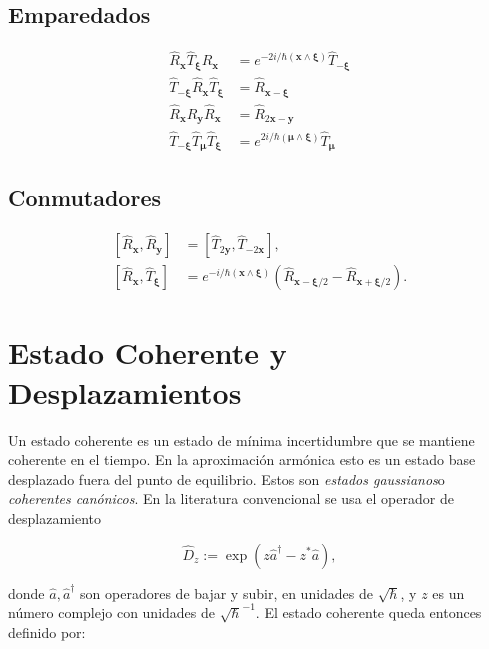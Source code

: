 \documentclass[a4paper,10pt]{article}
\newcommand{\xfase}{\mathbf{x}}
\newcommand{\yfase}{\mathbf{y}}
\newcommand{\xifase}{ {\boldsymbol{\xi}} }
\newcommand{\mufase}{ {\boldsymbol{\mu}} }
\begin{document}
\subsection{Emparedados}

\begin{equation}
\begin{split}
\hat{R}_\xfase \hat{T}_\xifase \hat{R}_\xfase 
&=e^{-2i/\hbar(\xfase\wedge\xifase)} \hat{T}_{-\xifase}\\
\hat{T}_{-\xifase}\hat{R}_\xfase \hat{T}_\xifase &=
\hat{R}_{\xfase-\xifase}\\
 \hat{R}_{\xfase}\hat{R}_\yfase \hat{R}_\xfase &=
\hat{R}_{2\xfase-\yfase}\\
 \hat{T}_{-\xifase}\hat{T}_\mufase \hat{T}_\xifase &=
e^{2i/\hbar (\mufase\wedge\xifase)}\hat{T}_{\mufase}
\end{split}
\end{equation}

\subsection{Conmutadores}


\begin{equation}
\begin{split}
[\hat{R}_\xfase ,\hat{R}_\yfase ]&=
[\hat{T}_{2\yfase} ,\hat{T}_{-2\xfase} ],\\
[\hat{R}_\xfase ,\hat{T}_\xifase ]&=
e^{-i/\hbar(\xfase\wedge\xifase)}
(\hat{R}_{\xfase-\xifase/2}-\hat{R}_{\xfase+\xifase/2}).
\end{split}
\end{equation}


\section{Estado Coherente y Desplazamientos}

Un estado coherente es un estado de mínima incertidumbre 
que se mantiene coherente en el tiempo. En la aproximación
armónica esto es un estado base desplazado fuera del punto de
equilibrio. Estos son \emph{estados gaussianos}o 
\emph{ coherentes canónicos}. En la literatura convencional
se usa el operador de desplazamiento

\begin{equation}
\hat{D}_z:= \exp(z\hat{a}^\dagger-z^*\hat{a}),
\end{equation}

donde $\hat{a}, \hat{a}^\dagger$ son operadores de bajar y subir,
en unidades de $\sqrt{\hbar}$, 
y $z$ es un número complejo con unidades de $\sqrt\hbar^{-1}$.
El estado coherente queda entonces definido por:
\end{document}

